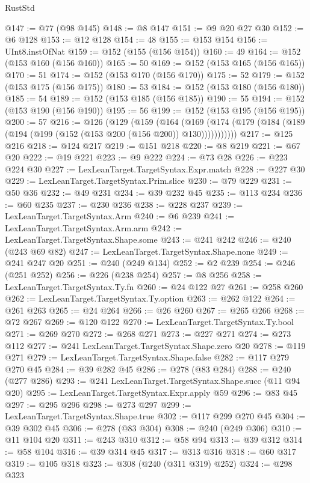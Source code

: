 \begin{lexlean}{RustStd}
\begin{coremodule}
{\begin{coremodule}
{{{{{{{{{{{@147 := @77 (@98 @145)
@148 := @8 @147
@151 := @9 @20 @27 @30
@152 := @6 @128
@153 := @12 @128
@154 := 48
@155 := @153 @154
@156 := UInt8.instOfNat
@159 := @152 (@155 (@156 @154))
@160 := 49
@164 := @152 (@153 @160 (@156 @160))
@165 := 50
@169 := @152 (@153 @165 (@156 @165))
@170 := 51
@174 := @152 (@153 @170 (@156 @170))
@175 := 52
@179 := @152 (@153 @175 (@156 @175))
@180 := 53
@184 := @152 (@153 @180 (@156 @180))
@185 := 54
@189 := @152 (@153 @185 (@156 @185))
@190 := 55
@194 := @152 (@153 @190 (@156 @190))
@195 := 56
@199 := @152 (@153 @195 (@156 @195))
@200 := 57
@216 := @126
    (@129
      (@159
        (@164
          (@169 (@174 (@179 (@184 (@189 (@194 (@199 (@152 (@153 @200 (@156 @200)) @130)))))))))))
@217 := @125 @216
@218 := @124 @217
@219 := @151 @218
@220 := @8 @219
@221 := @67 @20
@222 := @19 @221
@223 := @9 @222
@224 := @73 @28
@226 := @223 @224 @30
@227 := LexLeanTarget.TargetSyntax.Expr.match
@228 := @227 @30
@229 := LexLeanTarget.TargetSyntax.Prim.slice
@230 := @79 @229
@231 := @50 @36
@232 := @49 @231
@234 := @39 @232 @45
@235 := @113 @234
@236 := @60 @235
@237 := @230 @236
@238 := @228 @237
@239 := LexLeanTarget.TargetSyntax.Arm
@240 := @6 @239
@241 := LexLeanTarget.TargetSyntax.Arm.arm
@242 := LexLeanTarget.TargetSyntax.Shape.some
@243 := @241 @242
@246 := @240 (@243 @69 @82)
@247 := LexLeanTarget.TargetSyntax.Shape.none
@249 := @241 @247 @20
@251 := @240 (@249 @134)
@252 := @2 @239
@254 := @246 (@251 @252)
@256 := @226 (@238 @254)
@257 := @8 @256
@258 := LexLeanTarget.TargetSyntax.Ty.fn
@260 := @24 @122 @27
@261 := @258 @260
@262 := LexLeanTarget.TargetSyntax.Ty.option
@263 := @262 @122
@264 := @261 @263
@265 := @24 @264
@266 := @26 @260
@267 := @265 @266
@268 := @72 @267
@269 := @120 @122
@270 := LexLeanTarget.TargetSyntax.Ty.bool
@271 := @269 @270
@272 := @268 @271
@273 := @227 @271
@274 := @273 @112
@277 := @241 LexLeanTarget.TargetSyntax.Shape.zero @20
@278 := @119 @271
@279 := LexLeanTarget.TargetSyntax.Shape.false
@282 := @117 @279 @270 @45
@284 := @39 @282 @45
@286 := @278 (@83 @284)
@288 := @240 (@277 @286)
@293 := @241 LexLeanTarget.TargetSyntax.Shape.succ (@11 @94 @20)
@295 := LexLeanTarget.TargetSyntax.Expr.apply @59
@296 := @83 @45
@297 := @295 @296
@298 := @273 @297
@299 := LexLeanTarget.TargetSyntax.Shape.true
@302 := @117 @299 @270 @45
@304 := @39 @302 @45
@306 := @278 (@83 @304)
@308 := @240 (@249 @306)
@310 := @11 @104 @20
@311 := @243 @310
@312 := @58 @94
@313 := @39 @312
@314 := @58 @104
@316 := @39 @314 @45
@317 := @313 @316
@318 := @60 @317
@319 := @105 @318
@323 := @308 (@240 (@311 @319) @252)
@324 := @298 @323
}}}}}}}}}}}
\end{coremodule}}
\end{coremodule}
\end{lexlean}

